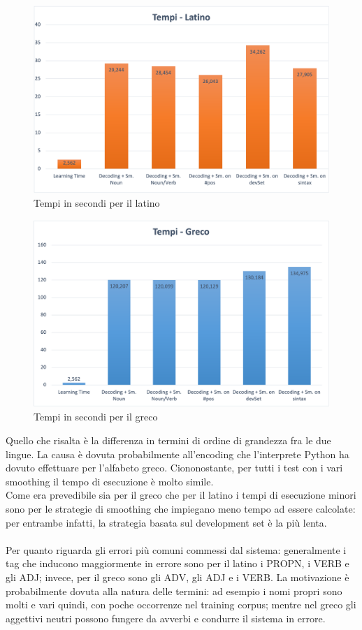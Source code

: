 \documentclass[12pt]{article}
\begin{document}
\begin{figure}[H]
   \centering
   \includegraphics[scale=0.5]{fig/TempiLatino.png}
   \caption{Tempi in secondi per il latino}\label{fig:tempiLatino}
\end{figure}

\begin{figure}[H]
   \centering
   \includegraphics[scale=0.5]{fig/TempiGreco.png}
   \caption{Tempi in secondi per il greco}\label{fig:tempiGreco}
\end{figure}

Quello che risalta è la differenza in termini di ordine di grandezza fra le due lingue. La causa è dovuta probabilmente all’encoding che l’interprete Python ha dovuto effettuare per l’alfabeto greco. Ciononostante, per tutti i test con i vari smoothing il tempo di esecuzione è molto simile.
\\Come era prevedibile sia per il greco che per il latino i tempi di esecuzione minori sono per le strategie di smoothing che impiegano meno tempo ad essere calcolate: per entrambe infatti, la strategia basata sul development set è la più lenta.
\\
\\Per quanto riguarda gli errori più comuni commessi dal sistema: generalmente i tag che inducono maggiormente in errore sono per il latino i PROPN, i VERB e gli ADJ; invece, per il greco sono gli ADV, gli ADJ e i VERB. La motivazione è probabilmente dovuta alla natura delle termini: ad esempio i nomi propri sono molti e vari quindi, con poche occorrenze nel training corpus; mentre nel greco gli aggettivi neutri possono fungere da avverbi e condurre il sistema in errore.
\end{document}

